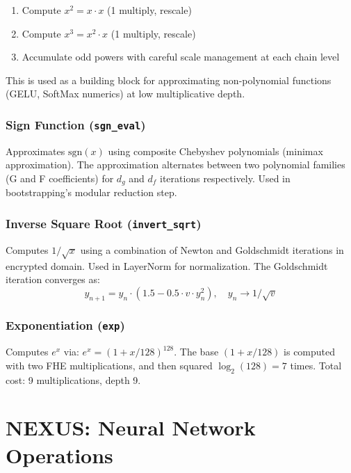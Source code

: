 \documentclass[11pt,letterpaper]{article}
\begin{document}
\begin{enumerate}
  \item Compute $x^2 = x \cdot x$ (1 multiply, rescale)
  \item Compute $x^3 = x^2 \cdot x$ (1 multiply, rescale)
  \item Accumulate odd powers with careful scale management at each chain level
\end{enumerate}

This is used as a building block for approximating non-polynomial functions (GELU,
SoftMax numerics) at low multiplicative depth.

\subsubsection{Sign Function (\texttt{sgn\_eval})}

Approximates $\text{sgn}(x)$ using composite Chebyshev polynomials (minimax approximation).
The approximation alternates between two polynomial families (G and F coefficients) for $d_g$
and $d_f$ iterations respectively. Used in bootstrapping's modular reduction step.

\subsubsection{Inverse Square Root (\texttt{invert\_sqrt})}

Computes $1/\sqrt{x}$ using a combination of Newton and Goldschmidt iterations in encrypted
domain. Used in LayerNorm for normalization. The Goldschmidt iteration converges as:
\[
y_{n+1} = y_n \cdot (1.5 - 0.5 \cdot v \cdot y_n^2), \quad y_n \to 1/\sqrt{v}
\]

\subsubsection{Exponentiation (\texttt{exp})}

Computes $e^x$ via: $e^x = (1 + x/128)^{128}$. The base $(1 + x/128)$ is computed with
two FHE multiplications, and then squared $\log_2(128) = 7$ times. Total cost: 9 multiplications,
depth 9.

\section{NEXUS: Neural Network Operations}
\label{sec:nexus-ops}
\end{document}
